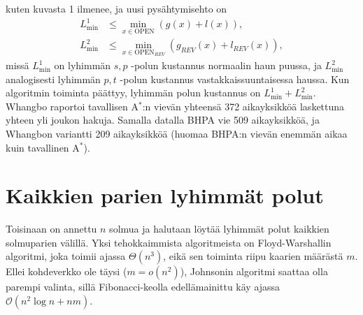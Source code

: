 \documentclass[finnish]{tktltiki2}
\theoremstyle{definition}
\theoremstyle{remark}
\begin{document}
kuten kuvasta 1 ilmenee, ja uusi pysähtymisehto on
\begin{align*}
L^1_{\min} & \leq \underset{x \in \text{OPEN}}{\min} (g(x) + l(x)), \\
L^2_{\min} & \leq \underset{x \in \text{OPEN}_{REV}}{\min} (g_{REV}(x) + l_{REV}(x)),
\end{align*}
missä $L_{\min}^1$ on lyhimmän $s, p$ -polun kustannus normaalin haun puussa, ja $L_{\min}^2$ analogisesti lyhimmän $p, t$ -polun kustannus vastakkaissuuntaisessa haussa. Kun algoritmin toiminta päättyy, lyhimmän polun kustannus on $L^1_{\min} + L^2_{\min}$. Whangbo raportoi tavallisen A$^{\ast}$:n vievän yhteensä 372 aikayksikköä laskettuna yhteen yli joukon hakuja. Samalla datalla BHPA vie 509 aikayksikköä, ja Whangbon variantti 209 aikayksikköä (huomaa BHPA:n vievän enemmän aikaa kuin tavallinen A$^{\ast}$).

\section{Kaikkien parien lyhimmät polut}
Toisinaan on annettu $n$ solmua ja halutaan löytää lyhimmät polut kaikkien solmuparien välillä. Yksi tehokkaimmista algoritmeista on Floyd-Warshallin algoritmi, joka toimii ajassa $\Theta(n^3)$, eikä sen toiminta riipu kaarien määrästä $m$. Ellei kohdeverkko ole täysi ($m = o(n^2)$), Johnsonin algoritmi saattaa olla parempi valinta, sillä Fibonacci-keolla edellämainittu käy ajassa $\mathcal{O}(n^2 \log n + nm)$. 
\end{document}
